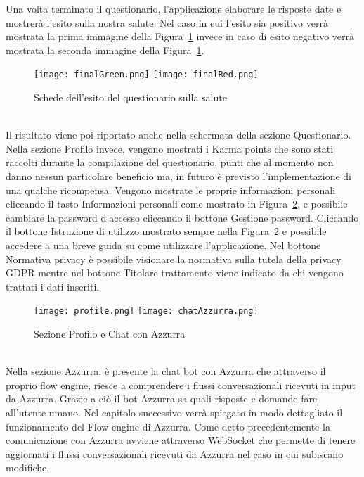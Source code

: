 \begin{trivlist}
	Una volta terminato il questionario, l'applicazione elaborare le risposte date e mostrerà l'esito sulla nostra salute. Nel caso in cui l'esito sia positivo verrà mostrata la prima immagine della Figura~\ref{fig:quefinal} invece in caso di esito negativo verrà mostrata la seconda immagine della Figura~\ref{fig:quefinal}.
	\begin{figure}[h]
		\begin{center}
			\texttt{[image: finalGreen.png]}\hfil
			\texttt{[image: finalRed.png]}
			\caption{Schede dell'esito del questionario sulla salute}\label{fig:quefinal}
		\end{center}
	\end{figure}\\
	Il risultato viene poi riportato anche nella schermata della sezione Questionario.
	\\
	Nella sezione Profilo invece, vengono mostrati i Karma points che sono stati raccolti durante la compilazione del questionario, punti che al momento non danno nessun particolare beneficio ma, in futuro è previsto l'implementazione di una qualche ricompensa. Vengono mostrate le proprie informazioni personali cliccando il tasto Informazioni personali come mostrato in Figura~\ref{fig:profile}, e possibile cambiare la password d'accesso cliccando il bottone Gestione password. Cliccando il bottone Istruzione di utilizzo mostrato sempre nella Figura~\ref{fig:profile} e possibile accedere a una breve guida su come utilizzare l'applicazione. Nel bottone Normativa privacy è possibile visionare la normativa sulla tutela della privacy GDPR mentre nel bottone Titolare trattamento viene indicato da chi vengono trattati i dati inseriti.
	\begin{figure}[h]
		\begin{center}
			\texttt{[image: profile.png]}\hfil
			\texttt{[image: chatAzzurra.png]}
			\caption{Sezione Profilo e Chat con Azzurra}\label{fig:profile}
		\end{center}
	\end{figure}\\
	Nella sezione Azzurra, è presente la chat bot con Azzurra che attraverso il proprio flow engine, riesce a comprendere i flussi conversazionali ricevuti in input da Azzurra. Grazie a ciò il bot Azzurra sa quali risposte e domande fare all'utente umano. Nel capitolo successivo verrà spiegato in modo dettagliato il funzionamento del Flow engine di Azzurra. Come detto precedentemente la comunicazione con Azzurra avviene attraverso WebSocket che permette di tenere aggiornati i flussi conversazionali ricevuti da Azzurra nel caso in cui subiscano modifiche.	
	
\end{trivlist}
